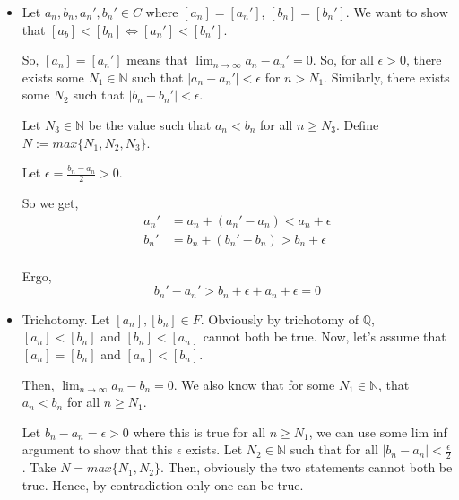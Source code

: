 \documentclass[12pt]{article}
\begin{document}
\begin{enumerate}[start=1,label={\bfseries Problem \arabic*:},leftmargin=1in]
\begin{enumerate}
        \begin{itemize}
            \item Let $a_{n}, b_{n}, a_{n}', b_{n}' \in C$ where $[a_{n}] = [a_{n}']$, $[b_{n}] = [b_{n}']$. We want to show that $[a_{b}] < [b_{n}] \Leftrightarrow [a_{n}'] < [b_{n}']$.
        
            So, $[a_{n}] = [a_{n}']$ means that $\lim_{n \to \infty} a_{n} - a_{n}' = 0$. 
            So, for all $\epsilon > 0$, there exists some $N_{1} \in \mathbb{N}$ such that $\left| a_{n} - a_{n}' \right| < \epsilon$ for $n > N_{1}$. 
            Similarly, there exists some $N_{2}$ such that $\left| b_{n} - b_{n}' \right| < \epsilon$. 
            
            Let $N_{3} \in \mathbb{N}$ be the value such that $a_{n} < b_{n}$ for all $n \geq N_{3}$. Define $N := max \{ N_{1}, N_{2}, N_{3}\}$. 
    
            Let $\epsilon = \frac{b_{n} - a_{n}}{2} > 0$. 
            
            So we get, 
            \begin{align*}
                a_{n}' &= a_{n} + (a_{n}' - a_{n}) < a_{n} + \epsilon  \\ 
                b_{n}' &= b_{n} + (b_{n}' - b_{n}) > b_{n} + \epsilon\\
            \end{align*}
    
            Ergo, 
            \[
                b_{n}' - a_{n}' > b_{n} + \epsilon + a_{n} + \epsilon = 0
            \]
    
            \item Trichotomy. Let $[a_{n}], [b_{n}] \in F$. Obviously by trichotomy of $\mathbb{Q}$, $[a_{n}] < [b_{n}]$ and $[b_{n}] < [a_{n}]$ cannot both be true. 
            Now, let's assume that $[a_{n}] = [b_{n}]$ and $[a_{n}] < [b_{n}]$. 

            Then, $\lim_{n \to \infty} a_{n} - b_{n} = 0$. We also know that for some $N_{1} \in \mathbb{N}$, that $a_{n} < b_{n}$ for all $n \geq N_{1}$. 
            
            Let $b_{n} - a_{n} = \epsilon > 0$ where this is true for all $n \geq N_{1}$, we can use some lim inf argument to show that this $\epsilon$ exists. 
            Let $N_{2} \in \mathbb{N}$ such that for all $|b_{n} - a_{n}| < \frac{\epsilon}{2}$. Take $N = max\{ N_{1}, N_{2}\}$. Then, obviously the two statements cannot both be true. Hence, by contradiction only one can be true. 
     

\end{itemize}
\end{enumerate}
\end{enumerate}
\end{document}
